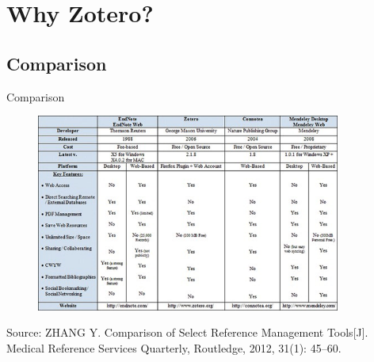 \documentclass[UTF8]{beamer}
\begin{document}

\section{Why Zotero?}

\subsection{Comparison}
\begin{frame}{Comparison}
%
\begin{figure}
\centering
\includegraphics[width=100mm]{figures/comparison.jpeg}
\end{figure}
\tiny
Source: ZHANG Y. Comparison of Select Reference Management Tools[J]. Medical Reference Services Quarterly, Routledge, 2012, 31(1): 45–60.  
\href{https://www.tandfonline.com/doi/full/10.1080/02763869.2012.641841?scroll=top&needAccess=true}{\color{blue}{[click here]}}
\end{frame}

\end{document}
